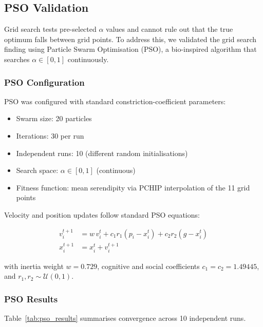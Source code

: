 \subsection{PSO Validation}

Grid search tests pre-selected $\alpha$ values and cannot rule out that the
true optimum falls between grid points.  To address this, we validated the
grid search finding using Particle Swarm Optimisation (PSO), a bio-inspired
algorithm that searches $\alpha \in [0, 1]$ continuously.

\subsubsection{PSO Configuration}

PSO was configured with standard constriction-coefficient parameters:

\begin{itemize}
    \item Swarm size: 20 particles
    \item Iterations: 30 per run
    \item Independent runs: 10 (different random initialisations)
    \item Search space: $\alpha \in [0, 1]$ (continuous)
    \item Fitness function: mean serendipity via PCHIP interpolation of the
          11 grid points
\end{itemize}

Velocity and position updates follow standard PSO equations:

\begin{align}
    v_i^{t+1} &= w\, v_i^t
                 + c_1 r_1 (p_i - x_i^t)
                 + c_2 r_2 (g  - x_i^t)
    \label{eq:pso_v} \\
    x_i^{t+1} &= x_i^t + v_i^{t+1}
    \label{eq:pso_x}
\end{align}

with inertia weight $w = 0.729$, cognitive and social coefficients
$c_1 = c_2 = 1.49445$, and $r_1, r_2 \sim \mathcal{U}(0,1)$.

\subsubsection{PSO Results}

Table~\ref{tab:pso_results} summarises convergence across 10 independent runs.

